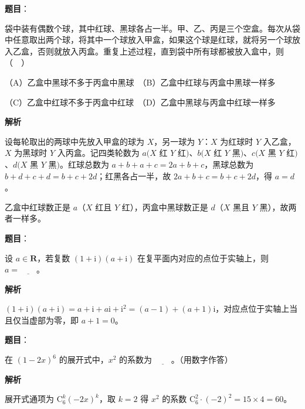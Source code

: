\begin{answer}

\textbf{题目}：

袋中装有偶数个球，其中红球、黑球各占一半。甲、乙、丙是三个空盒。每次从袋中任意取出两个球，将其中一个球放入甲盒，如果这个球是红球，就将另一个球放入乙盒，否则就放入丙盒。重复上述过程，直到袋中所有球都被放入盒中，则（　）

（A）乙盒中黑球不多于丙盒中黑球　（B）乙盒中红球与丙盒中黑球一样多

（C）乙盒中红球不多于丙盒中红球　（D）乙盒中黑球与丙盒中红球一样多

\textbf{解析}

设每轮取出的两球中先放入甲盒的球为 \(X\)，另一球为 \(Y\)：\(X\) 为红球时 \(Y\) 入乙盒，\(X\) 为黑球时 \(Y\) 入丙盒。记四类轮数为 \(a(X\) 红 \(Y\) 红\()\)、\(b(X\) 红 \(Y\) 黑\()\)、\(c(X\) 黑 \(Y\) 红\()\)、\(d(X\) 黑 \(Y\) 黑\()\)。红球总数为 \(a+b+a+c=2a+b+c\)，黑球总数为 \(b+d+c+d=b+c+2d\)；红黑各占一半，故 \(2a+b+c=b+c+2d\)，得 \(a=d\)。

乙盒中红球数正是 \(a\)（\(X\) 红且 \(Y\) 红），丙盒中黑球数正是 \(d\)（\(X\) 黑且 \(Y\) 黑），故两者一样多。


\end{answer}
\begin{answer}

\textbf{题目}：

设 \(a\in\mathbf{R}\)，若复数 \((1+\mathrm{i})(a+\mathrm{i})\) 在复平面内对应的点位于实轴上，则 \(a=\underline{\qquad}\)。

\textbf{解析}

\((1+\mathrm i)(a+\mathrm i)=a+\mathrm i+a\mathrm i+\mathrm i^2=(a-1)+(a+1)\mathrm i\)，对应点位于实轴上当且仅当虚部为零，即 \(a+1=0\)。


\end{answer}
\begin{answer}

\textbf{题目}：

在 \((1-2x)^{6}\) 的展开式中，\(x^{2}\) 的系数为 \(\underline{\qquad}\)。（用数字作答）

\textbf{解析}

展开式通项为 \(\mathrm C_6^{k}(-2x)^{k}\)，取 \(k=2\) 得 \(x^2\) 的系数 \(\mathrm C_6^{2}\cdot(-2)^2=15\times4=60\)。


\end{answer}
